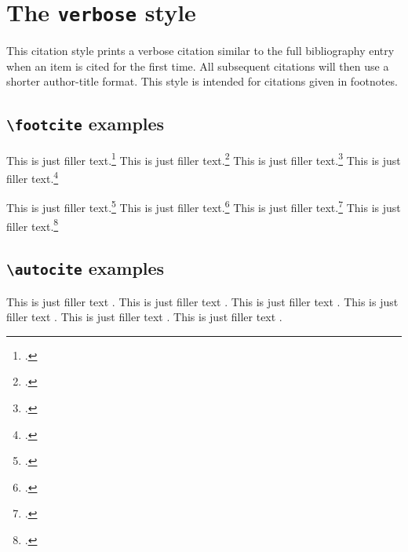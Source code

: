 \documentclass[a4paper]{article}
\newcommand{\cmd}[1]{\texttt{\textbackslash #1}}
\begin{document}
\section*{The \texttt{verbose} style}

This citation style prints a verbose citation similar to the full
bibliography entry when an item is cited for the first time. All
subsequent citations will then use a shorter author-title format.
This style is intended for citations given in footnotes.

\subsection*{\cmd{footcite} examples}

This is just filler text.\footcite{aristotle:anima}
This is just filler text.\footcite{aristotle:physics}
This is just filler text.\footcite{aristotle:anima}
This is just filler text.\footcite{aristotle:physics}

\clearpage

This is just filler text.\footcite{kant:kpv}
This is just filler text.\footcite{kant:ku}
This is just filler text.\footcite[24]{kant:kpv}
This is just filler text.\footcite[59--63]{kant:ku}

\clearpage

\subsection*{\cmd{autocite} examples}


This is just filler text \autocite{aristotle:rhetoric}.
This is just filler text \autocite{averroes/bland}.
This is just filler text \autocite{aristotle:rhetoric}.
This is just filler text \autocite{aristotle:anima}.
This is just filler text \autocite{aristotle:physics}.
This is just filler text \autocite{aristotle:physics}.

\clearpage


\printshorthands
\printbibliography
\end{document}
